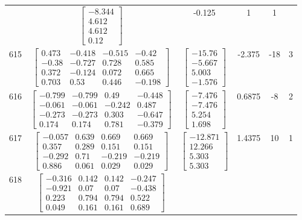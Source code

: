 \documentclass[a4paper,12pt]{article}
\begin{document}
\begin{tabular}{c c c c c c}
&
$\begin{bmatrix} -8.344 \\ 4.612 \\ 4.612 \\ 0.12 \end{bmatrix}$
&
-0.125
&
1
&
1
\\
615
&
$\begin{bmatrix} 0.473 & -0.418 & -0.515 & -0.42 \\ -0.38 & -0.727 & 0.728 & 0.585 \\ 0.372 & -0.124 & 0.072 & 0.665 \\ 0.703 & 0.53 & 0.446 & -0.198 \end{bmatrix}$
&
$\begin{bmatrix} -15.76 \\ -5.667 \\ 5.003 \\ -1.576 \end{bmatrix}$
&
-2.375
&
-18
&
3
\\
616
&
$\begin{bmatrix} -0.799 & -0.799 & 0.49 & -0.448 \\ -0.061 & -0.061 & -0.242 & 0.487 \\ -0.273 & -0.273 & 0.303 & -0.647 \\ 0.174 & 0.174 & 0.781 & -0.379 \end{bmatrix}$
&
$\begin{bmatrix} -7.476 \\ -7.476 \\ 5.254 \\ 1.698 \end{bmatrix}$
&
0.6875
&
-8
&
2
\\
617
&
$\begin{bmatrix} -0.057 & 0.639 & 0.669 & 0.669 \\ 0.357 & 0.289 & 0.151 & 0.151 \\ -0.292 & 0.71 & -0.219 & -0.219 \\ 0.886 & 0.061 & 0.029 & 0.029 \end{bmatrix}$
&
$\begin{bmatrix} -12.871 \\ 12.266 \\ 5.303 \\ 5.303 \end{bmatrix}$
&
1.4375
&
10
&
1
\\
618
&
$\begin{bmatrix} -0.316 & 0.142 & 0.142 & -0.247 \\ -0.921 & 0.07 & 0.07 & -0.438 \\ 0.223 & 0.794 & 0.794 & 0.522 \\ 0.049 & 0.161 & 0.161 & 0.689 \end{bmatrix}$

\end{tabular}
\end{document}
